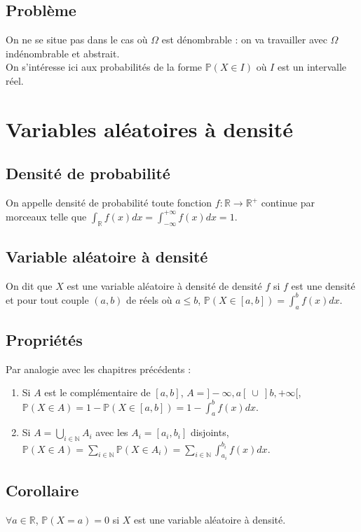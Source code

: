 \documentclass[a4paper,10pt]{book} %
\newcommand{\R}{\mathbb{R}}
\newcommand{\N}{\mathbb{N}}
\renewcommand{\P}{\mathbb{P}} %
\begin{document}
\subsection{Problème}
On ne se situe pas dans le cas où $\Omega$ est dénombrable : on va travailler avec $\Omega$ indénombrable et abstrait.\\

On s'intéresse ici aux probabilités de la forme $\P(X\in I)$ où $I$ est un intervalle réel.

\section{Variables aléatoires à densité}
\subsection{Densité de probabilité}
On appelle densité de probabilité toute fonction $f : \R\rightarrow \R^+$ continue par morceaux telle que $\displaystyle \int_\R f(x)dx = \int_{-\infty}^{+\infty}f(x)dx=1$.

\subsection{Variable aléatoire à densité}
On dit que $X$ est une variable aléatoire à densité de densité $f$ si $f$ est une densité et pour tout couple $(a,b)$ de réels où $a\leq b$, $\displaystyle \P(X\in [a,b]) =\int_a^bf(x)dx$.

\subsection{Propriétés}
Par analogie avec les chapitres précédents : \\
\begin{enumerate}
\item Si $A$ est le complémentaire de $[a,b]$, $\displaystyle A = ]-\infty,a[~\cup~]b,+\infty[$,\\$\displaystyle \P(X\in A)=1-\P(X\in [a,b])=1-\int_a^bf(x)dx$.

\item Si $\displaystyle A =\bigcup_{i\in \N}A_i$ avec les $A_i = [a_i, b_i]$ disjoints, $\displaystyle \P(X\in A)=\sum_{i\in \N}\P(X\in A_i)=\sum_{i\in \N}\int_{a_i}^{b_i}f(x)dx$.
\end{enumerate}

\newpage

\subsection{Corollaire}
$\forall a\in \R$, $\P(X = a)=0$ si $X$ est une variable aléatoire à densité.
\end{document}
